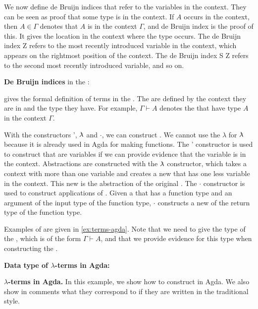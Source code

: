 We now define de Bruijn indices that refer to the variables in the context.
They can be seen as proof that some type is in the context. If $A$ occurs in the context, 
then $A \in \Gamma$ denotes that $A$ is in the context $\Gamma$, and de Bruijn index is the proof of this.
It gives the location in the context where the type occurs. 
The de Bruijn index \textsf{Z} refers to the most recently introduced variable in the context, which appears on the rightmost position of the context.
The de Bruijn index \textsf{S Z} refers to the second most recently introduced variable, and so on.

\begin{definition}
  \label{def:deBruijn:agda}
  \textbf{De Bruijn indices} in the \lc:
  
\end{definition}

 gives the formal definition of terms in the \lc.
The \lterms are defined by the context they are in and the type they have. For example,
$\Gamma \vdash A$ denotes the \lterms that have type $A$ in the context $\Gamma$.

With the constructors \textsf{'}, $\lambdabar$ and $\cdot$, we can construct \lterms.
We cannot use the $\lambda$ for $\lambdabar$ because it is already used in Agda for making functions.
The \textsf{'} constructor is used to construct \lterms that are variables if we can provide evidence that the variable is in the context.
Abstractions are constructed with the $\lambdabar$ constructor, which takes a context with more than one variable
and creates a new \lterm that has one less variable in the context. This new \lterm is the abstraction of the original \lterm.
The $\cdot$ constructor is used to construct applications of \lterms.
Given a \lterm that has a function type and an argument of the input type of the function type, $\cdot$ constructs a new \lterm of the return type of the function type.

Examples of \lterms are given in \cref{ex:terms-agda}.
Note that we need to give the type of the \lterm, which is of the form $\Gamma \vdash A$,
and that we provide evidence for this type when constructing the \lterm. 

\begin{definition}
  \label{def:terms:agda}
  \textbf{Data type of \boldmath${\lambda}$-terms in Agda:}
  
\end{definition}

\begin{example}
  \label{ex:terms-agda}
  \textbf{\boldmath${\lambda}$-terms in Agda.}
  In this example, we show how to construct \lterms in Agda. 
  We also show in comments what \lterms they correspond to if they are written in the traditional style.
  
\end{example}

